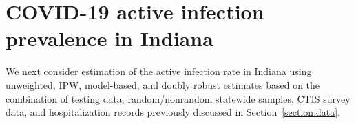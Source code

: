 \documentclass[11pt]{amsart}
\numberwithin{equation}{section}
\theoremstyle{plain}
\begin{document}

 \section{COVID-19 active infection prevalence in Indiana}
 \label{section:applications}


 We next consider estimation of the active infection rate in Indiana using unweighted, IPW, model-based, and doubly robust estimates based on the combination of testing data, random/nonrandom statewide samples, CTIS survey data, and hospitalization records previously discussed in Section~\ref{section:data}.
\end{document}
